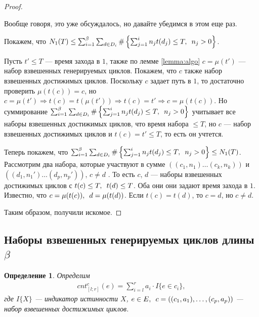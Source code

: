 \documentclass{article}
\makeatletter
\newcommand{\squad}{
    \hspace{0.5em}
}
\let\@msm@th@eqref\eqref
\renewcommand{\eqref}[1]{%
  \begingroup
  \leavevmode
  \color{violet}%
  \hypersetup{linkbordercolor=[named]{violet}}%
  \@msm@th@eqref{#1}%
  \endgroup
}
\newtheorem{definition}{Определение}
\makeatother
\begin{document}
\begin{proof} $ $

    Вообще говоря, это уже обсуждалось, но давайте убедимся в этом еще раз.

    \medskip

    Покажем, что $N_{1}(T) \leq \sum_{i = 1}^{\beta}{\sum_{d \in D_{i}}{\#\left\{\sum_{j = 1}^{i}{n_{j}t(d_{j}) \leq T, \squad n_{j} > 0}\right\}}}$.

    Пусть $t' \leq T$ --- время захода в $1$, также по лемме \eqref{lemma:algo} $c = \mu(t')$ --- набор взвешенных генерируемых циклов. Покажем, что $c$ также набор взвешенных достижимых циклов. Поскольку $c$ задает путь в $1$, то достаточно проверить $\mu(t(c)) = c$, но 
    $c = \mu(t') \Rightarrow t(c) = t(\mu(t')) \Rightarrow t(c) = t' \Rightarrow c = \mu(t(c))$. Но суммирование $\sum_{i = 1}^{\beta}{\sum_{d \in D_{i}}{\#\left\{\sum_{j = 1}^{i}{n_{j}t(d_{j}) \leq T, \squad n_{j} > 0}\right\}}}$ учитывает все наборы взвешенных достижимых циклов, что время набора $\leq T$, но $c$ --- набор взвешенных достижимых циклов и $t(c) = t' \leq T$, то есть он учтется.  

    \medskip

    Теперь покажем, что $\sum_{i = 1}^{\beta}{\sum_{d \in D_{i}}{\#\left\{\sum_{j = 1}^{i}{n_{j}t(d_{j}) \leq T, \squad n_{j} > 0}\right\}}} \leq N_{1}(T)$. Рассмотрим два набора, которые участвуют в сумме $((c_{1}, n_{1}) \ldots (c_{k}, n_{k}))$ и $((d_{1}, n_{1}') \ldots (d_{p}, n_{p}'))$,
    $c \neq d$ . То есть $c$, $d$ --- наборы взвешенных достижимых циклов с $t(c) \leq T, \squad t(d) \leq T$.
    Оба они они задают время захода в $1$. Известно, что $c = \mu(t(c)), \squad d = \mu(t(d))$. Если $t(c) = t(d)$, то $c = d$, но $c \neq d$.

    \medskip

    Таким образом, получили искомое.
\end{proof}

\subsection{\texorpdfstring{Наборы взвешенных генерируемых циклов длины $\beta$}{}}

\begin{definition}
    Определим
    \begin{gather*}
        cnt_{[l;r]}^{c}(e) = \sum_{i = l}^{r}{a_{i} \cdot I\{e \in c_{i}\}},
    \end{gather*} 
    где $I\{X\}$ --- индикатор истинности $X$, $e \in E, \squad c = ((c_{1}, a_{1}), \ldots, (c_{p}, a_{p}))$ --- набор взвешенных достижимых циклов.
\end{definition}
\end{document}
